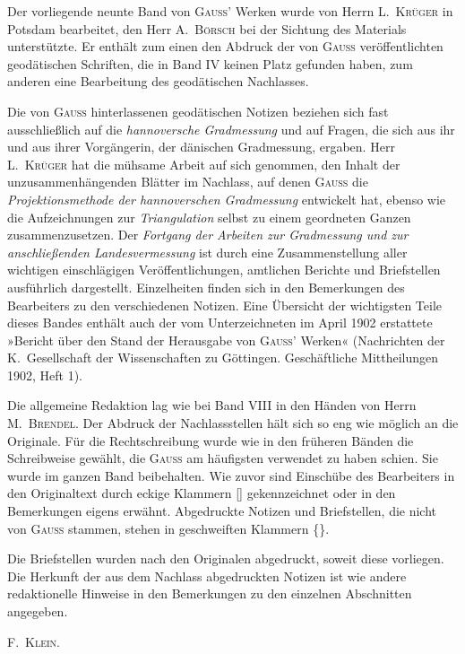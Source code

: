 Der vorliegende neunte Band von \textsc{Gauss}' Werken wurde von Herrn L.~\textsc{Krüger} in Potsdam bearbeitet, den Herr A.~\textsc{Börsch} bei der Sichtung des Materials unterstützte. Er enthält zum einen den Abdruck der von \textsc{Gauss} veröffentlichten geodätischen Schriften, die in Band IV keinen Platz gefunden haben, zum anderen eine Bearbeitung des geodätischen Nachlasses.

Die von \textsc{Gauss} hinterlassenen geodätischen Notizen beziehen sich fast ausschließlich auf die \textit{hannoversche Gradmessung} und auf Fragen, die sich aus ihr und aus ihrer Vorgängerin, der dänischen Gradmessung, ergaben. Herr L.~\textsc{Krüger} hat die mühsame Arbeit auf sich genommen, den Inhalt der unzusammenhängenden Blätter im Nachlass, auf denen \textsc{Gauss} die \textit{Projektionsmethode der hannoverschen Gradmessung} entwickelt hat, ebenso wie die Aufzeichnungen zur \textit{Triangulation} selbst zu einem geordneten Ganzen zusammenzusetzen. Der \textit{Fortgang der Arbeiten zur Gradmessung und zur anschließenden Landesvermessung} ist durch eine Zusammenstellung aller wichtigen einschlägigen Veröffentlichungen, amtlichen Berichte und Briefstellen ausführlich dargestellt. Einzelheiten finden sich in den Bemerkungen des Bearbeiters zu den verschiedenen Notizen. Eine Übersicht der wichtigsten Teile dieses Bandes enthält auch der vom Unterzeichneten im April 1902 erstattete »Bericht über den Stand der Herausgabe von \textsc{Gauss}' Werken« (Nachrichten der K.~Gesellschaft der Wissenschaften zu Göttingen. Geschäftliche Mittheilungen 1902, Heft 1).

Die allgemeine Redaktion lag wie bei Band VIII in den Händen von Herrn M.~\textsc{Brendel}. Der Abdruck der Nachlassstellen hält sich so eng wie möglich an die Originale. Für die Rechtschreibung wurde wie in den früheren Bänden die Schreibweise gewählt, die \textsc{Gauss} am häufigsten verwendet zu haben schien. Sie wurde im ganzen Band beibehalten. Wie zuvor sind Einschübe des Bearbeiters in den Originaltext durch eckige Klammern [] gekennzeichnet oder in den Bemerkungen eigens erwähnt. Abgedruckte Notizen und Briefstellen, die nicht von \textsc{Gauss} stammen, stehen in geschweiften Klammern \{\}.

Die Briefstellen wurden nach den Originalen abgedruckt, soweit diese vorliegen. Die Herkunft der aus dem Nachlass abgedruckten Notizen ist wie andere redaktionelle Hinweise in den Bemerkungen zu den einzelnen Abschnitten angegeben.\par
\hfill F.~\textsc{Klein.}\hspace*{\parindent}\par

